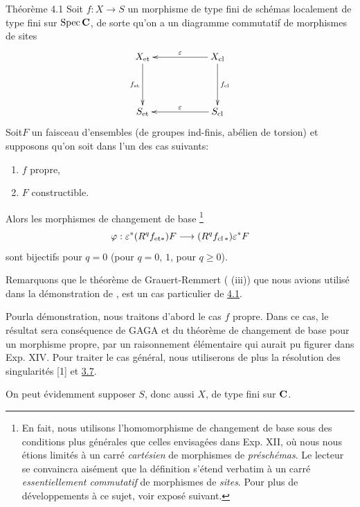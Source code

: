 \documentclass[10pt]{../fichiers-configuration-latex/smfart}
\begin{document}
\begin{enonce*}{Théorème 4.1}
Soit $f:X\rightarrow S$ un morphisme de type fini de schémas
localement de type fini sur $\operatorname{Spec} \mathbf{C}$, de sorte qu'on a un
diagramme commutatif de morphismes de sites
$$
\xymatrix@C=2cm@R=1.5cm{
X_{\et}  \ar[d]_{f_{\et}}                   &   X_{\cl}
\ar[l]_{\varepsilon} \ar[d]^{f_{\cl}} \\
S_{\et}                    &   S_{\cl}\ar[l]_{\varepsilon} 
}
$$
Soit\pageoriginale $F$ un faisceau d'ensembles (\resp de groupes
ind-finis, \resp abélien de torsion) et supposons qu'on soit dans l'un
des cas suivants:
\begin{enumerate}
\renewcommand{\theenumi}{\roman{enumi}}
\renewcommand{\labelenumi}{(\theenumi)}
\item $f$ propre,

\item $F$ constructible.
\end{enumerate}
Alors les morphismes de changement de base 
\footnote[1]{En fait, nous utilisons l'homomorphisme de changement de
base sous des conditions plus générales que celles envisagées dans
Exp. XII, où nous nous étions limités à un carré \emph{cartésien} de
morphismes de \emph{préschémas}. Le lecteur se convaincra aisément que
la définition s'étend verbatim à un carré \emph{essentiellement
commutatif} de morphismes de \emph{sites}. Pour plus de développements
à ce sujet, voir exposé suivant.}
$$
\varphi:\varepsilon^{\ast}(R^{q}f_{\mathrm{et}\ast})F\longrightarrow
(R^{q}f_{\operatorname{cl}\ast})\varepsilon {}^{\ast}F
$$
sont bijectifs pour $q=0$ (\resp pour $q=0$, $1$, \resp pour $q\geq
0$).
\end{enonce*}

Remarquons que le théorème de Grauert-Remmert ( (iii)) que nous
avions utilisé dans la démonstration de , est un cas particulier
de \hyperref[XVI.thm4.1]{4.1}.

Pour\pageoriginale la démonstration, nous traitons d'abord le cas $f$
propre. Dans ce cas, le résultat sera conséquence de GAGA et du
théorème de changement de base pour un morphisme propre, par un
raisonnement élémentaire qui aurait pu figurer dans Exp. XIV. Pour
traiter le cas général, nous utiliserons de plus la résolution des
singularités [1] et \hyperref[XVI.thm3.7]{3.7}.

On peut évidemment supposer $S$, donc aussi $X$, de type fini sur
$\mathbf{C}$.
\end{document}
